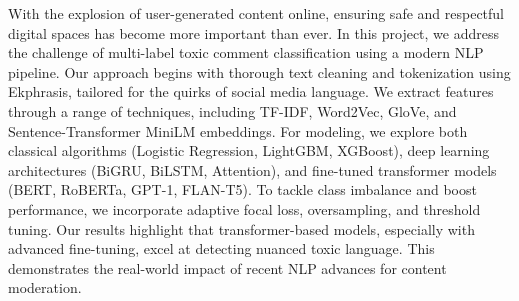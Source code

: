 

{
    With the explosion of user-generated content online, ensuring safe and respectful digital spaces has become more important than ever. In this project, we address the challenge of multi-label toxic comment classification using a modern NLP pipeline. Our approach begins with thorough text cleaning and tokenization using Ekphrasis, tailored for the quirks of social media language. We extract features through a range of techniques, including TF-IDF, Word2Vec, GloVe, and Sentence-Transformer MiniLM embeddings. For modeling, we explore both classical algorithms (Logistic Regression, LightGBM, XGBoost), deep learning architectures (BiGRU, BiLSTM, Attention), and fine-tuned transformer models (BERT, RoBERTa, GPT-1, FLAN-T5). To tackle class imbalance and boost performance, we incorporate adaptive focal loss, oversampling, and threshold tuning. Our results highlight that transformer-based models, especially with advanced fine-tuning, excel at detecting nuanced toxic language. This demonstrates the real-world impact of recent NLP advances for content moderation.
}